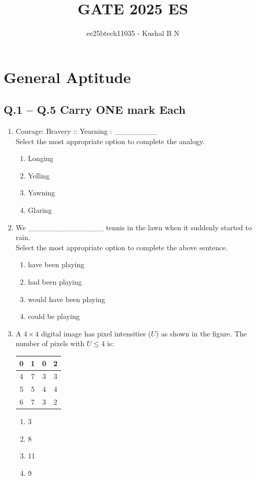 \documentclass[journal]{IEEEtran}
\title{\textbf{GATE 2025 ES}}
\author{ee25btech11035 - Kushal B N}
\begin{document}
\maketitle
\section*{General Aptitude}

\subsection*{Q.1 -- Q.5 Carry ONE mark Each}

\begin{enumerate}
\item Courage: Bravery :: Yearning : \_\_\_\_\_\_\_\_ \\
Select the most appropriate option to complete the analogy.
\hfill{}
\begin{enumerate}
\item Longing
\item Yelling
\item Yawning
\item Glaring
\end{enumerate}

\item We \_\_\_\_\_\_\_\_\_\_\_\_\_\_ tennis in the lawn when it suddenly started to rain. \\
Select the most appropriate option to complete the above sentence.
\hfill{}
\begin{enumerate}
\item have been playing
\item had been playing
\item would have been playing
\item could be playing
\end{enumerate}

\item A $4 \times 4$ digital image has pixel intensities ($U$) as shown in the figure. The number of pixels with $U \le 4$ is:
\hfill{}
\begin{center}
\begin{tabular}{|c|c|c|c|}
\hline
0 & 1 & 0 & 2 \\
\hline
4 & 7 & 3 & 3 \\
\hline
5 & 5 & 4 & 4 \\
\hline
6 & 7 & 3 & 2 \\
\hline
\end{tabular}
\end{center}
\begin{enumerate}
\item 3
\item 8
\item 11
\item 9
\end{enumerate}


\end{enumerate}
\end{document}
